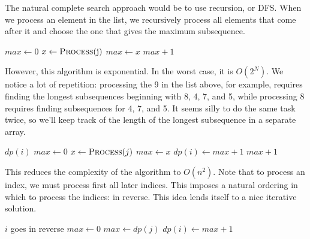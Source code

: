 The natural complete search approach would be to use recursion, or DFS. When we process an element in the list, we recursively process all elements that come after it and choose the one that gives the maximum subsequence.

\noindent \begin{minipage}{\textwidth}
\begin{algorithmic}
\State $max \gets 0$
		\State $x \gets \Call{Process}{$j$}$
			\State $max \gets x$
		\EndIf
	\EndIf
\EndFor
\State \Return $max + 1$
\EndFunction
\end{algorithmic}
\end{minipage}

However, this algorithm is exponential. In the worst case, it is $O(2^N)$. We notice a lot of repetition: processing the 9 in the list above, for example, requires finding the longest subsequences beginning with 8, 4, 7, and 5, while processing 8 requires finding subsequences for 4, 7, and 5. It seems silly to do the same task twice, so we'll keep track of the length of the longest subsequence in a separate array.

\noindent \begin{minipage}{\textwidth}
\begin{algorithmic}
	\State \Return $dp(i)$
\EndIf
\State $max \gets 0$
		\State $x \gets \Call{Process}{j}$
			\State $max \gets x$
		\EndIf
	\EndIf
\EndFor
\State $dp(i) \gets max + 1$
\State \Return $max + 1$
\EndFunction
\end{algorithmic}
\end{minipage}

This reduces the complexity of the algorithm to $O(n^2)$. Note that to process an index, we must process first all later indices. This imposes a natural ordering in which to process the indices: in reverse. This idea lends itself to a nice iterative solution.

\noindent \begin{minipage}{\textwidth}
\begin{algorithmic}
	\Comment $i$ goes in reverse
	\State $max \gets 0$
				\State $max \gets dp(j)$
			\EndIf
		\EndIf
	\EndFor
	\State $dp(i) \gets max + 1$
\EndFor
\end{algorithmic}
\end{minipage}

